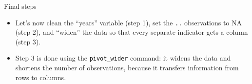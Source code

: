 \documentclass[10pt,ignorenonframetext,]{beamer}
\newenvironment{Shaded}{\begin{snugshade}}{\end{snugshade}}
\newcommand{\CommentTok}[1]{\textcolor[rgb]{0.56,0.35,0.01}{\textit{#1}}}
\newcommand{\DataTypeTok}[1]{\textcolor[rgb]{0.13,0.29,0.53}{#1}}
\newcommand{\DecValTok}[1]{\textcolor[rgb]{0.00,0.00,0.81}{#1}}
\newcommand{\KeywordTok}[1]{\textcolor[rgb]{0.13,0.29,0.53}{\textbf{#1}}}
\newcommand{\NormalTok}[1]{#1}
\newcommand{\OperatorTok}[1]{\textcolor[rgb]{0.81,0.36,0.00}{\textbf{#1}}}
\newcommand{\OtherTok}[1]{\textcolor[rgb]{0.56,0.35,0.01}{#1}}
\newcommand{\StringTok}[1]{\textcolor[rgb]{0.31,0.60,0.02}{#1}}
\begin{document}
\begin{frame}[fragile]{Final steps}
\protect\hypertarget{final-steps}{}

\begin{itemize}
\item
  Let's now clean the ``years'' variable (step 1), set the \texttt{..}
  observations to NA (step 2), and ``widen'' the data so that every
  separate indicator gets a column (step 3).
\item
  Step 3 is done using the \texttt{pivot\_wider} command: it widens the
  data and shortens the number of observations, because it transfers
  information from rows to columns.
\end{itemize}

\begin{Shaded}
\end{Shaded}

\end{frame}
\end{document}
